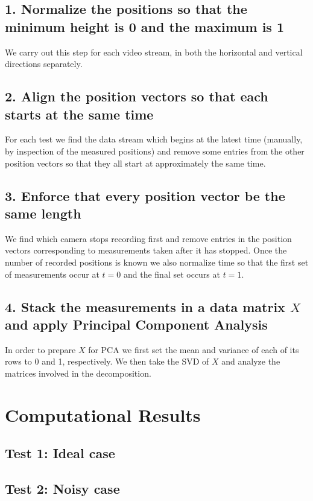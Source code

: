 \documentclass[fleqn,10pt]{../SelfArx} %
\begin{document}
\subsection*{1. Normalize the positions so that the minimum height is 0 and the maximum is 1}
We carry out this step for each video stream, in both the horizontal and vertical directions separately.

\subsection*{2. Align the position vectors so that each starts at the same time}
For each test we find the data stream which begins at the latest time (manually, by inspection of the measured positions) and remove some entries from the other position vectors so that they all start at approximately the same time.

\subsection*{3. Enforce that every position vector be the same length}
We find which camera stops recording first and remove entries in the position vectors corresponding to measurements taken after it has stopped. Once the number of recorded positions is known we also normalize time so that the first set of measurements occur at $t=0$ and the final set occurs at $t=1$.

\subsection*{4. Stack the measurements in a data matrix $X$ and apply Principal Component Analysis}
In order to prepare $X$ for PCA we first set the mean and variance of each of its rows to 0 and 1, respectively. We then take the SVD of $X$ and analyze the matrices involved in the decomposition.



\section{Computational Results} %
\label{sec:computational_results}

\subsection{Test 1: Ideal case}

\subsection{Test 2: Noisy case}
\end{document}
